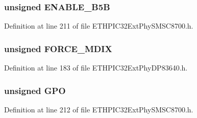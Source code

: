 \subsubsection[{E\+N\+A\+B\+L\+E\+\_\+4\+B5\+B}]{\setlength{\rightskip}{0pt plus 5cm}unsigned E\+N\+A\+B\+L\+E\+\_\+B5\+B}\label{union_____p_h_y_c_t_r_lbits__t_aa7e55b5482aacc5ef122817a689f46c5}


Definition at line 211 of file E\+T\+H\+P\+I\+C32\+Ext\+Phy\+S\+M\+S\+C8700.\+h.

\hypertarget{union_____p_h_y_c_t_r_lbits__t_ab098e1df2ec30fe7609da13ae5529f5c}{}
\subsubsection[{F\+O\+R\+C\+E\+\_\+\+M\+D\+I\+X}]{\setlength{\rightskip}{0pt plus 5cm}unsigned F\+O\+R\+C\+E\+\_\+\+M\+D\+I\+X}\label{union_____p_h_y_c_t_r_lbits__t_ab098e1df2ec30fe7609da13ae5529f5c}


Definition at line 183 of file E\+T\+H\+P\+I\+C32\+Ext\+Phy\+D\+P83640.\+h.

\hypertarget{union_____p_h_y_c_t_r_lbits__t_a93071ef0e9f696741e0fc90011de4633}{}
\subsubsection[{G\+P\+O}]{\setlength{\rightskip}{0pt plus 5cm}unsigned G\+P\+O}\label{union_____p_h_y_c_t_r_lbits__t_a93071ef0e9f696741e0fc90011de4633}


Definition at line 212 of file E\+T\+H\+P\+I\+C32\+Ext\+Phy\+S\+M\+S\+C8700.\+h.

\hypertarget{union_____p_h_y_c_t_r_lbits__t_a82dd39bbcd32e1e7365136884d962219}{}
